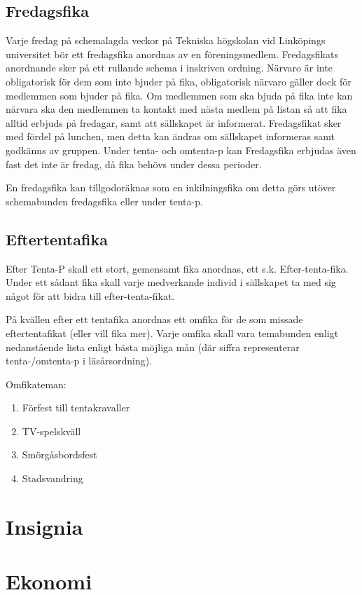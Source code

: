 \documentclass{article}
\begin{document}
\subsection{Fredagsfika} \label{fredagsfika} %
Varje fredag på schemalagda veckor på Tekniska högskolan vid Linköpings
universitet bör ett fredagsfika anordnas av en föreningsmedlem. Fredagsfikats
anordnande sker på ett rullande schema i inskriven ordning. Närvaro är inte
obligatorisk för dem som inte bjuder på fika, obligatorisk närvaro gäller dock
för medlemmen som bjuder på fika. Om medlemmen som ska bjuda på fika inte kan
närvara ska den medlemmen ta kontakt med nästa medlem på listan så att fika
alltid erbjuds på fredagar, samt att sällskapet är informerat. Fredagsfikat sker
med fördel på lunchen, men detta kan ändras om sällskapet informeras samt
godkänns av gruppen. Under tenta- och omtenta-p kan Fredagsfika erbjudas även
fast det inte är fredag, då fika behövs under dessa perioder.

En fredagsfika kan tillgodoräknas som en inkilningsfika om detta görs utöver
schemabunden fredagsfika eller under tenta-p.

\subsection{Eftertentafika} %
Efter Tenta-P skall ett stort, gemensamt fika anordnas, ett s.k.
Efter-tenta-fika. Under ett sådant fika skall varje medverkande individ i
sällskapet ta med sig något för att bidra till efter-tenta-fikat.

På kvällen efter ett tentafika anordnas ett omfika för de som missade
eftertentafikat (eller vill fika mer). Varje omfika skall vara temabunden enligt
nedanstående lista enligt bästa möjliga mån (där siffra representerar
tenta-/omtenta-p i läsårsordning).

Omfikateman:
\begin{enumerate}
  \item Förfest till tentakravaller
  \item TV-spelskväll
  \item Smörgåsbordsfest
  \item Stadsvandring
\end{enumerate}

\section{Insignia}

\section{Ekonomi}
\end{document}

